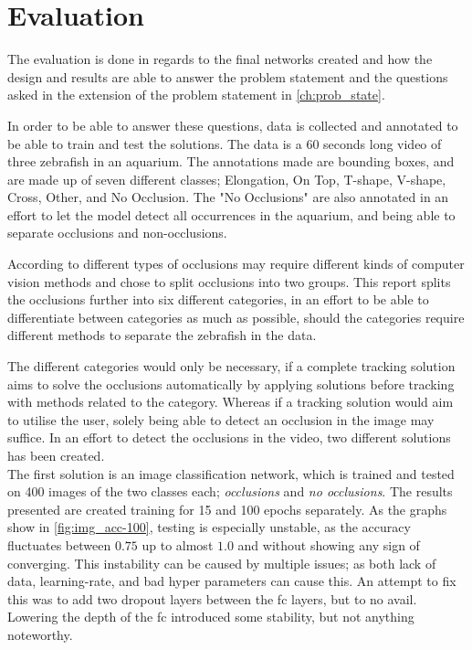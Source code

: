 \chapter{Evaluation}
The evaluation is done in regards to the final networks created and how the design and results are able to answer the problem statement and the questions asked in the extension of the problem statement in \autoref{ch:prob_state}.

In order to be able to answer these questions, data is collected and annotated to be able to train and test the solutions. The data is a 60 seconds long video of three zebrafish in an aquarium. The annotations made are bounding boxes, and are made up of seven different classes; Elongation, On Top, T-shape, V-shape, Cross, Other, and No Occlusion. The "No Occlusions" are also annotated in an effort to let the model detect all occurrences in the aquarium, and being able to separate occlusions and non-occlusions. 

According to \cite{Dolado2014} different types of occlusions may require different kinds of computer vision methods and chose to split occlusions into two groups. This report splits the occlusions further into six different categories, in an effort to be able to differentiate between categories as much as possible, should the categories require different methods to separate the zebrafish in the data.

The different categories would only be necessary, if a complete tracking solution aims to solve the occlusions automatically by applying solutions before tracking with methods related to the category. Whereas if a tracking solution would aim to utilise the user, solely being able to detect an occlusion in the image may suffice.
In an effort to detect the occlusions in the video, two different solutions has been created.\\ 

The first solution is an image classification network, which is trained and tested on 400 images of the two classes each; \textit{occlusions} and \textit{no occlusions}. The results presented are created training for 15 and 100 epochs separately. As the graphs show in \autoref{fig:img_acc-100}, testing is especially unstable, as the accuracy fluctuates between $0.75$ up to almost $1.0$ and without showing any sign of converging. This instability can be caused by multiple issues; as both lack of data, learning-rate, and bad hyper parameters can cause this. An attempt to fix this was to add two dropout layers between the \gls{fc} layers, but to no avail. Lowering the depth of the \gls{fc} introduced some stability, but not anything noteworthy.

